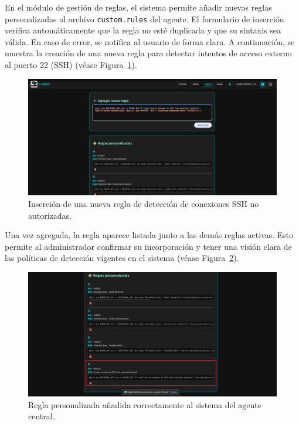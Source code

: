 \documentclass[11pt,a4paper,twoside]{report}
\begin{document}
En el módulo de gestión de reglas, el sistema permite añadir nuevas reglas personalizadas al archivo \texttt{custom.rules} del agente. El formulario de inserción verifica automáticamente que la regla no esté duplicada y que su sintaxis sea válida. En caso de error, se notifica al usuario de forma clara. A continuación, se muestra la creación de una nueva regla para detectar intentos de acceso externo al puerto 22 (SSH) (véase Figura~\ref{fig:insertar_regla_ssh}).

\begin{figure}[H]
	\centering
	\includegraphics[width=1\textwidth]{pruebas/5.png}
	\caption{Inserción de una nueva regla de detección de conexiones SSH no autorizadas.}
	\label{fig:insertar_regla_ssh}
\end{figure}

Una vez agregada, la regla aparece listada junto a las demás reglas activas. Esto permite al administrador confirmar su incorporación y tener una visión clara de las políticas de detección vigentes en el sistema (véase Figura~\ref{fig:regla_ssh_insertada}).

\begin{figure}[H]
	\centering
	\includegraphics[width=1\textwidth]{pruebas/6.png}
	\caption{Regla personalizada añadida correctamente al sistema del agente central.}
	\label{fig:regla_ssh_insertada}
\end{figure}
\end{document}
